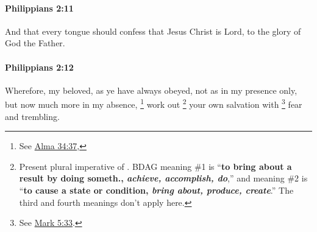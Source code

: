 		\paragraph{Philippians 2:11} %
			\label{PHILIPPIANS-2-11}

			And that every tongue should confess that Jesus Christ is Lord, to the glory of God the Father.

			\begin{framed}
			\scriptsize
				\begin{compactdesc}
					\item[SBLG] 
				\end{compactdesc}
			\end{framed}

		\paragraph{Philippians 2:12} %
			\label{PHILIPPIANS-2-12}

			Wherefore, my beloved, as ye have always obeyed, not as in my presence only, but now much more in my absence,
				\footnote{%
					See \hyperref[ALMA-34-37]{Alma 34:37}, 
					}%
			work out%
				\footnote{%
					Present plural imperative of . BDAG meaning \#1 is ``\textbf{to bring about a result by doing someth., \textit{achieve, accomplish, do}},'' and meaning \#2 is ``\textbf{to cause a state or condition, \textit{bring about, produce, create}}.'' The third and fourth meanings don't apply here. 
					}
			your own salvation with
				\footnote{%
					See \hyperref[MARK-5-33]{Mark 5:33}.
					}%
			fear and trembling.

